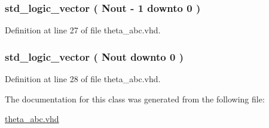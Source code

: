 \subsubsection[{th\+\_\+c}]{ {\bfseries \textcolor{comment}{std\+\_\+logic\+\_\+vector}\textcolor{vhdlchar}{ }\textcolor{vhdlchar}{(}\textcolor{vhdlchar}{ }\textcolor{vhdlchar}{ }\textcolor{vhdlchar}{ }\textcolor{vhdlchar}{ }{\bfseries {\bf Nout}} \textcolor{vhdlchar}{-\/}\textcolor{vhdlchar}{ } \textcolor{vhdldigit}{1} \textcolor{vhdlchar}{ }\textcolor{keywordflow}{downto}\textcolor{vhdlchar}{ }\textcolor{vhdlchar}{ } \textcolor{vhdldigit}{0} \textcolor{vhdlchar}{ }\textcolor{vhdlchar}{)}\textcolor{vhdlchar}{ }} \hspace{0.3cm}{\ttfamily [Signal]}}\label{classtheta__abc_1_1theta__abc_a99d308b4a97dff4ea9faacf3778ac0f1}


Definition at line 27 of file theta\+\_\+abc.\+vhd.

\hypertarget{classtheta__abc_1_1theta__abc_a45f5cb01816ecd5555fc839e392dfe6a}{}
\subsubsection[{th\+\_\+ci}]{ {\bfseries \textcolor{comment}{std\+\_\+logic\+\_\+vector}\textcolor{vhdlchar}{ }\textcolor{vhdlchar}{(}\textcolor{vhdlchar}{ }\textcolor{vhdlchar}{ }\textcolor{vhdlchar}{ }\textcolor{vhdlchar}{ }{\bfseries {\bf Nout}} \textcolor{vhdlchar}{ }\textcolor{keywordflow}{downto}\textcolor{vhdlchar}{ }\textcolor{vhdlchar}{ } \textcolor{vhdldigit}{0} \textcolor{vhdlchar}{ }\textcolor{vhdlchar}{)}\textcolor{vhdlchar}{ }} \hspace{0.3cm}{\ttfamily [Signal]}}\label{classtheta__abc_1_1theta__abc_a45f5cb01816ecd5555fc839e392dfe6a}


Definition at line 28 of file theta\+\_\+abc.\+vhd.



The documentation for this class was generated from the following file\+:\begin{DoxyCompactItemize}
\item 
\hyperlink{theta__abc_8vhd}{theta\+\_\+abc.\+vhd}\end{DoxyCompactItemize}
